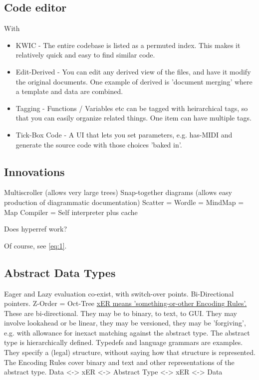 \documentclass[twocolumn]{article}
\begin{document}
\subsection{Code editor }
With
\begin{itemize}[noitemsep]
\item KWIC - The entire codebase is listed as a permuted index.  This makes it relatively quick and easy to find similar code.
\item Edit-Derived - You can edit any derived view of the files, and have it modify the original documents.  One example of derived is 'document merging' where a template and data are combined.
\label{bottomright}
\item Tagging - Functions / Variables etc can be tagged with heirarchical tags, so that you can easily organize related things.  One item can have multiple tags.
\item Tick-Box Code - A UI that lets you set parameters, e.g. has-MIDI and generate the source code with those choices 'baked in'.
\label{bottomleft}
\end{itemize}

\subsection{Innovations}
Multiscroller (allows very large trees)
Snap-together diagrams (allows easy production of diagrammatic documentation)
Scatter = Wordle = MindMap = Map
Compiler = Self interpreter plus cache
\label{topright}

Does hyperref work? 

Of course, see \eqref{eq:1}.

\subsection{Abstract Data Types}
Eager and Lazy evaluation co-exist, with switch-over points.
Bi-Directional pointers.
Z-Order = Oct-Tree
\hyperref[bottomright]{xER means 'something-or-other Encoding Rules'.}  These are bi-directional.  They may be to binary, to text, to GUI.  They may involve lookahead or be linear, they may be versioned, they may be 'forgiving', e.g. with allowance for inexact matching against the abstract type.
The abstract type is hierarchically defined.  Typedefs and language grammars are examples.  They specify a (legal) structure, without saying how that structure is represented.  The Encoding Rules cover binary and text and other representations of the abstract type.
Data <-> xER <-> Abstract Type <-> xER <-> Data

\begin{figure}
    \centering
\end{figure}
\end{document}
